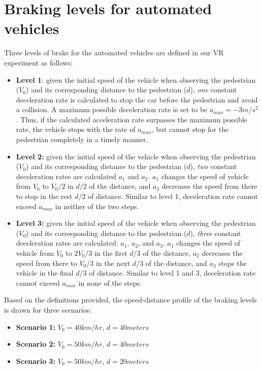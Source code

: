 \chapter{Braking levels for automated vehicles}
\label{A:brake}
Three levels of brake for the automated vehicles are defined in our VR experiment as follows:
\begin{itemize}
    \item \textbf{Level 1}: given the initial speed of the vehicle when observing the pedestrian ($V_0$) and its corresponding distance to the pedestrian ($d$), \textit{one} constant deceleration rate is calculated to stop the car before the pedestrian and avoid a collision. A maximum possible deceleration rate is set to be $a_{max} = -3 m/s^2$. Thus, if the calculated acceleration rate surpasses the maximum possible rate, the vehicle stops with the rate of $a_{max}$, but cannot stop for the pedestrian completely in a timely manner. 
    \item \textbf{Level 2:} given the initial speed of the vehicle when observing the pedestrian ($V_0$) and its corresponding distance to the pedestrian ($d$), \textit{two} constant deceleration rates are calculated $a_1$ and $a_2$. $a_1$ changes the speed of vehicle from $V_0$ to $V_0/2$ in $d/2$ of the distance, and $a_2$ decreases the speed from there to stop in the rest $d/2$ of distance. Similar to level 1, deceleration rate cannot exceed $a_{max}$ in neither of the two steps. 
    \item \textbf{Level 3:} given the initial speed of the vehicle when observing the pedestrian ($V_0$) and its corresponding distance to the pedestrian ($d$), \textit{three} constant deceleration rates are calculated: $a_1$, $a_2$, and $a_3$. $a_1$ changes the speed of vehicle from $V_0$ to $2V_0/3$ in the first $d/3$ of the distance, $a_2$ decreases the speed from there to $V_0/3$ in the next $d/3$ of the distance, and $a_3$ stops the vehicle in the final $d/3$ of distance. Similar to level 1 and 3, deceleration rate cannot exceed $a_{max}$ in none of the steps. 
\end{itemize}
Based on the definitions provided, the speed-distance profile of the braking levels is drawn for three scenarios:
\begin{itemize}
    \item \textbf{Scenario 1:} $V_0 = 40 km/hr$, $d = 40 meters$ 
    
     \item \textbf{Scenario 2:} $V_0 = 50 km/hr$, $d = 40 meters$ 
     
     \item \textbf{Scenario 3:} $V_0 = 50 km/hr$, $d = 20 meters$ 
\end{itemize}

